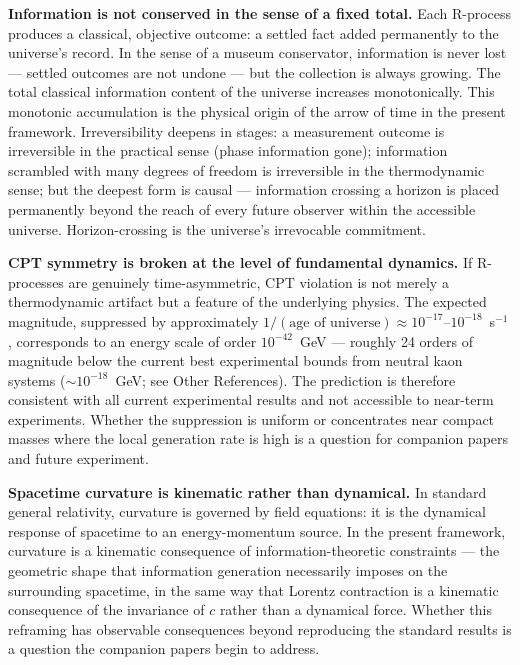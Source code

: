 \documentclass[12pt]{article}
\begin{document}
\medskip
\noindent\textbf{Information is not conserved in the sense of a
fixed total.}
Each R-process produces a classical, objective outcome: a settled
fact added permanently to the universe's record.
In the sense of a museum conservator, information is never lost ---
settled outcomes are not undone --- but the collection is always
growing.
The total classical information content of the universe increases
monotonically.
This monotonic accumulation is the physical origin of the arrow of
time in the present framework.
Irreversibility deepens in stages: a measurement outcome is
irreversible in the practical sense (phase information gone);
information scrambled with many degrees of freedom is irreversible
in the thermodynamic sense; but the deepest form is causal ---
information crossing a horizon is placed permanently beyond the reach
of every future observer within the accessible universe.
Horizon-crossing is the universe's irrevocable commitment.

\medskip
\noindent\textbf{CPT symmetry is broken at the level of fundamental
dynamics.}
If R-processes are genuinely time-asymmetric, CPT violation is not
merely a thermodynamic artifact but a feature of the underlying
physics.
The expected magnitude, suppressed by approximately
$1/(\text{age of universe}) \approx 10^{-17}$--$10^{-18}$~s$^{-1}$,
corresponds to an energy scale of order $10^{-42}$~GeV --- roughly
24 orders of magnitude below the current best experimental bounds
from neutral kaon systems ($\sim 10^{-18}$~GeV; see Other References).
The prediction is therefore consistent with all current experimental
results and not accessible to near-term experiments.
Whether the suppression is uniform or concentrates near compact masses
where the local generation rate is high is a question for companion
papers and future experiment.

\medskip
\noindent\textbf{Spacetime curvature is kinematic rather than
dynamical.}
In standard general relativity, curvature is governed by field
equations: it is the dynamical response of spacetime to an
energy-momentum source.
In the present framework, curvature is a kinematic consequence of
information-theoretic constraints --- the geometric shape that
information generation necessarily imposes on the surrounding
spacetime, in the same way that Lorentz contraction is a kinematic
consequence of the invariance of $c$ rather than a dynamical force.
Whether this reframing has observable consequences beyond reproducing
the standard results is a question the companion papers begin to
address.
\end{document}
